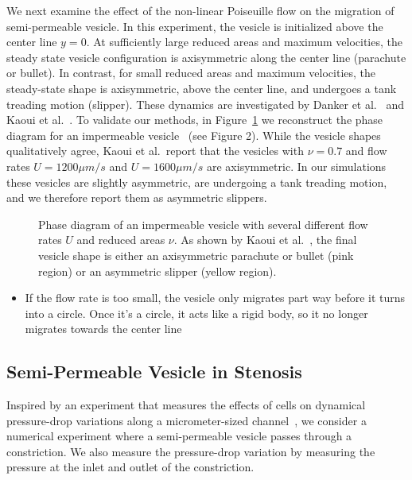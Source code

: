 \documentclass[9pt,twocolumn,twoside,lineno]{pnas-new}
\newif\ifTikz
\begin{document}
We next examine the effect of the non-linear Poiseuille flow on the
migration of semi-permeable vesicle. In this experiment, the vesicle is
initialized above the center line $y=0$. At sufficiently large reduced
areas and maximum velocities, the steady state vesicle configuration is
axisymmetric along the center line (parachute or bullet). In contrast,
for small reduced areas and maximum velocities, the steady-state shape
is axisymmetric, above the center line, and undergoes a tank treading
motion (slipper). These dynamics are investigated by Danker et
al.~\cite{dan-vla-mis2009} and Kaoui et al.~\cite{kao-bir-mis2009}. To
validate our methods, in Figure~\ref{fig:parabolicOffCenterPhaseDiagram}
we reconstruct the phase diagram for an impermeable
vesicle~\cite{kao-bir-mis2009} (see Figure 2). While the vesicle shapes
qualitatively agree, Kaoui et al.~report that the vesicles with
$\nu=0.7$ and flow rates $U = 1200 \mu m/s$ and $U = 1600 \mu m/s$ are
axisymmetric. In our simulations these vesicles are slightly asymmetric,
are undergoing a tank treading motion, and we therefore report them as
asymmetric slippers.

\begin{figure}[htp]
  \ifTikz
  
  \fi
  \caption{\label{fig:parabolicOffCenterPhaseDiagram} Phase diagram of
  an impermeable vesicle with several different flow rates $U$ and
  reduced areas $\nu$. As shown by Kaoui et al.~\cite{kao-bir-mis2009},
  the final vesicle shape is either an axisymmetric parachute or bullet
  (pink region) or an asymmetric slipper (yellow region).}
\end{figure}



\begin{itemize}
  \item If the flow rate is too small, the vesicle only migrates part
    way before it turns into a circle. Once it's a circle, it acts like
    a rigid body, so it no longer migrates towards the center line
\end{itemize}

\subsection*{Semi-Permeable Vesicle in Stenosis}
Inspired by an experiment that measures the effects of cells on 
dynamical pressure-drop variations along a micrometer-sized
channel~\cite{abk-fai-sto2006}, we consider a numerical experiment where
a semi-permeable vesicle passes through a constriction. We also measure
the pressure-drop variation by measuring the pressure at the inlet and
outlet of the constriction. 
\end{document}

